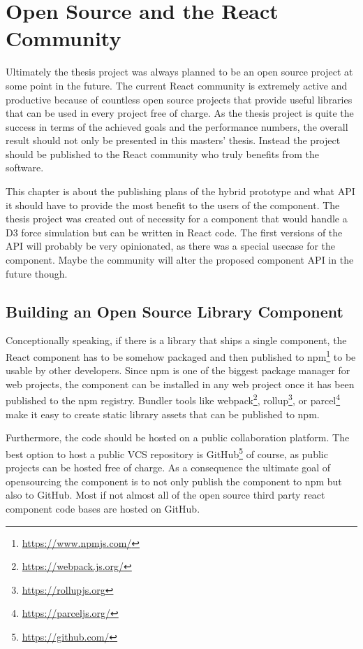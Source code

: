 \chapter{Open Source and the React Community}
\label{cha:opensource}

Ultimately the thesis project was always planned to be an open source project at some point in the future. The current React community is extremely active and productive because of countless open source projects that provide useful libraries that can be used in every project free of charge. As the thesis project is quite the success in terms of the achieved goals and the performance numbers, the overall result should not only be presented in this masters' thesis. Instead the project should be published to the React community who truly benefits from the software.

This chapter is about the publishing plans of the hybrid prototype and what API it should have to provide the most benefit to the users of the component. The thesis project was created out of necessity for a component that would handle a D3 force simulation but can be written in React code. The first versions of the API will probably be very opinionated, as there was a special usecase for the component. Maybe the community will alter the proposed component API in the future though.

\section{Building an Open Source Library Component}

Conceptionally speaking, if there is a library that ships a single component, the React component has to be somehow packaged and then published to npm\footnote{\url{https://www.npmjs.com/}} to be usable by other developers. Since npm is one of the biggest package manager for web projects, the component can be installed in any web project once it has been published to the npm registry. Bundler tools like webpack\footnote{\url{https://webpack.js.org/}}, rollup\footnote{\url{https://rollupjs.org}}, or parcel\footnote{\url{https://parceljs.org/}} make it easy to create static library assets that can be published to npm.

Furthermore, the code should be hosted on a public collaboration platform. The best option to host a public VCS repository is GitHub\footnote{\url{https://github.com/}} of course, as public projects can be hosted free of charge. As a consequence the ultimate goal of opensourcing the component is to not only publish the component to npm but also to GitHub. Most if not almost all of the open source third party react component code bases are hosted on GitHub.

